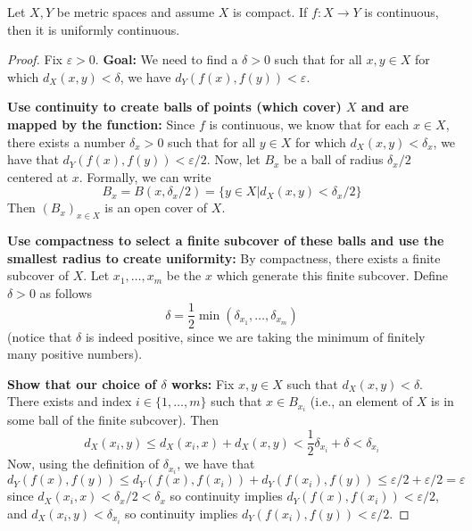 \documentclass[11pt]{article}
\numberwithin{equation}{section}
\theoremstyle{definition}
\theoremstyle{definition}
\newcommand{\1}{\mathbbm 1}
\def\d{\delta}
\newcommand{\e}{\varepsilon}
\begin{document}
\begin{theorem}
	Let $X,Y$ be metric spaces and assume $X$ is compact. If $f: X \to Y$ is continuous, then it is uniformly continuous. 
\end{theorem}
\begin{proof}
	Fix $\e > 0$. \textbf{Goal:} We need to find a $\d > 0$ such that for all $x,y \in X$ for which $d_X(x,y) < \d$, we have $d_Y(f(x),f(y)) < \e$. 

	\textbf{Use continuity to create balls of points (which cover) $X$ and are mapped by the function:} Since $f$ is continuous, we know that for each $x \in X$, there exists a number $\d_x > 0$ such that for all $y \in X$ for which $d_X(x,y) < \d_x$, we have that $d_Y(f(x),f(y)) < \e/2$. Now, let $B_x$ be a ball of radius $\d_x/2$ centered at $x$. Formally, we can write
	\begin{equation*}
		B_x = B(x, \d_x / 2) = \{y \in X | d_X(x,y) < \d_x /2 \} 
	\end{equation*}
	Then $(B_x)_{x\in X}$ is an open cover of $X$. 

	\textbf{Use compactness to select a finite subcover of these balls and use the smallest radius to create uniformity:} By compactness, there exists a finite subcover of $X$. Let $x_1, \ldots, x_m$ be the $x$ which generate this finite subcover. Define $\d > 0$ as follows
	\begin{equation}
		\d = \frac{1}{2} \min (\d_{x_1}, \ldots, \d_{x_m})
	\end{equation}
	(notice that $\d$ is indeed positive, since we are taking the minimum of finitely many positive numbers).

	\textbf{Show that our choice of $\d$ works:} Fix $x,y \in X$ such that $d_X(x,y) < \d$. There exists and index $i \in \{1, \ldots, m\}$ such that $x \in B_{x_i}$ (i.e., an element of $X$ is in some ball of the finite subcover). Then
	\begin{equation}
		d_X(x_i,y) \leq d_X(x_i, x) + d_X(x,y) < \frac{1}{2} \d_{x_i} + \d < \d_{x_i} 
	\end{equation} 
	Now, using the definition of $\d_{x_i}$, we have that
	\begin{equation}
		d_Y(f(x),f(y)) \leq d_Y(f(x),f(x_i)) + d_Y(f(x_i),f(y)) \leq \e/2 + \e/2 = \e
	\end{equation}
	since $d_X(x_i, x) < \d_x / 2 < \delta_x$ so continuity implies $d_Y(f(x),f(x_i)) < \e / 2$, and  $d_X(x_i,y) < \d_{x_i}$ so continuity implies  $d_Y(f(x_i),f(y)) < \e /2$.
\end{proof}
\end{document}
